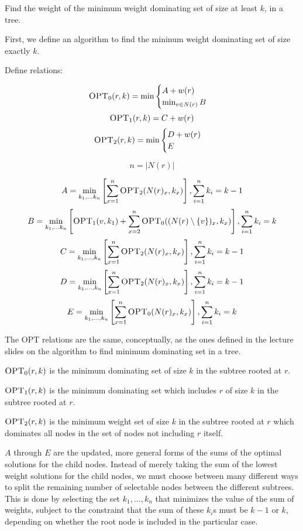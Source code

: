 \documentclass[11pt]{article}
\begin{document}

Find the weight of the minimum weight dominating set of size at least $k$, in a tree.

\begin{solution}
First, we define an algorithm to find the mininum weight dominating set of
size exactly $k$.

Define relations:

$$\textsc{OPT}_0(r, k) = \min 
\begin{cases} 
    A + w(r) \\
    \min_{v \in N(r)} B
\end{cases}$$
$$\textsc{OPT}_1(r, k) = C + w(r)$$
$$\textsc{OPT}_2(r, k) = \min
\begin{cases}
    D + w(r) \\
    E
\end{cases}$$

$$n = |N(r)|$$

$$A = \min_{k_1,...k_n} \left[\sum_{x = 1}^n \textsc{OPT}_2(N(r)_x, k_x) \right], \sum_{i=1}^n
k_i = k - 1$$
$$B = \min_{k_1,...k_n} \left[\textsc{OPT}_1(v,k_1) + \sum_{x = 2}^n
\textsc{OPT}_0((N(r) \setminus \{v\})_x, k_x) \right], \sum_{i=1}^n
k_i = k$$
$$C = \min_{k_1,...,k_n} \left[ \sum_{x=1}^n \textsc{OPT}_2(N(r)_x,k_x)\right], \sum_{i=1}^n
k_i = k - 1$$
$$D = \min_{k_1,...,k_n} \left[\sum_{x=1}^n \textsc{OPT}_2(N(r)_x, k_x)\right], \sum_{i=1}^n
k_i = k - 1 $$
$$E = \min_{k_1,...,k_n} \left[\sum_{x=1}^n \textsc{OPT}_0(N(r)_x, k_x)\right], \sum_{i=1}^n
k_i = k$$

The \textsc{OPT} relations are the same, conceptually, as the ones defined in
the lecture slides on the algorithm to find minimum dominating set in a tree.

$\textsc{OPT}_0(r, k)$ is the minimum dominating set of size $k$ in the
subtree rooted at $r$.

$\textsc{OPT}_1(r, k)$ is the minimum dominating set which includes $r$ of size $k$ in the
subtree rooted at $r$.

$\textsc{OPT}_2(r, k)$ is the minimum weight set of size $k$ in the subtree
rooted at $r$ which dominates all nodes in the set of nodes not including $r$
itself.

$A$ through $E$ are the updated, more general forms of the sums of the optimal
solutions for the child nodes. Instead of merely taking the sum of the lowest
weight solutions for the child nodes, we must choose between many different
ways to split the remaining number of selectable nodes between the different
subtrees. This is done by selecting the set $k_1,...,k_n$ that minimizes the
value of the sum of weights, subject to the constraint that the sum of these $k_i$s must be $k-1$ or
$k$, depending on whether the root node is included in the particular case.


\end{solution}
\end{document}
